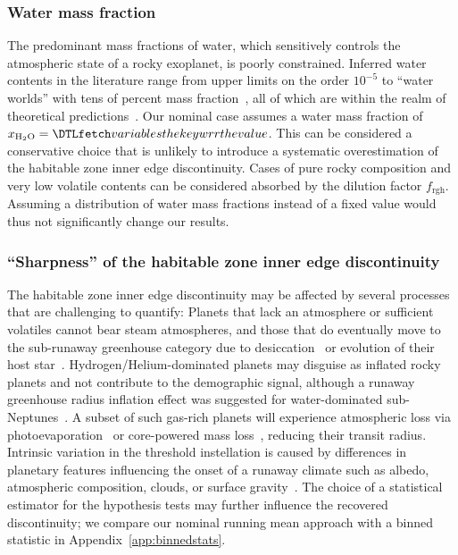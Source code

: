 \documentclass[twocolumn,twocolappendix]{aastex631}
\begin{document}
\subsubsection{Water mass fraction}
The predominant mass fractions of water, which sensitively controls the atmospheric state of a rocky exoplanet, is poorly constrained.
Inferred water contents in the literature range from upper limits on the order $10^{-5}$ to ``water worlds'' with tens of percent mass fraction~\citep[e.g.,][]{Rogers2010,Unterborn2018,Mousis2020,Agol2021,Luque2022}, all of which are within the realm of theoretical predictions~\citep{Mulders2015b,Sato2016,Jin2018,Lichtenberg2019,Bitsch2019b,Venturini2020,Emsenhuber2021b,Schlecker2021,2022ApJ...938L...3L,2022ApJ...939L..19I}.
Our nominal case assumes a water mass fraction of $x_\mathrm{H_2O} = \var{wrr}$.
This can be considered a conservative choice that is unlikely to introduce a systematic overestimation of the habitable zone inner edge discontinuity. %
Cases of pure rocky composition and very low volatile contents can be considered absorbed by the dilution factor $f_\mathrm{rgh}$.
Assuming a distribution of water mass fractions instead of a fixed value would thus not significantly change our results.

\subsubsection{``Sharpness'' of the habitable zone inner edge discontinuity}
The habitable zone inner edge discontinuity may be affected by several processes that are challenging to quantify:
Planets that lack an atmosphere or sufficient volatiles cannot bear steam atmospheres, and those that do eventually move to the sub-runaway greenhouse category due to desiccation~\citep[][]{Watson1981} or evolution of their host star~\citep{Luger2015}.
Hydrogen/Helium-dominated planets may disguise as inflated rocky planets and not contribute to the demographic signal, although a runaway greenhouse radius inflation effect was suggested for water-dominated sub-Neptunes~\citep{Pierrehumbert2022,Innes2023}.
A subset of such gas-rich planets will experience atmospheric loss via photoevaporation~\citep{Owen2013} or core-powered mass loss~\citep{Ginzburg2018}, reducing their transit radius.
Intrinsic variation in the threshold instellation is caused by differences in planetary features influencing the onset of a runaway climate such as albedo, atmospheric composition, clouds, or surface gravity~\citep{Turbet2021,Lichtenberg2021c,Pierrehumbert2022,Innes2023}.
The choice of a statistical estimator for the hypothesis tests may further influence the recovered discontinuity; we compare our nominal running mean approach with a binned statistic in Appendix~\ref{app:binnedstats}.
\end{document}
